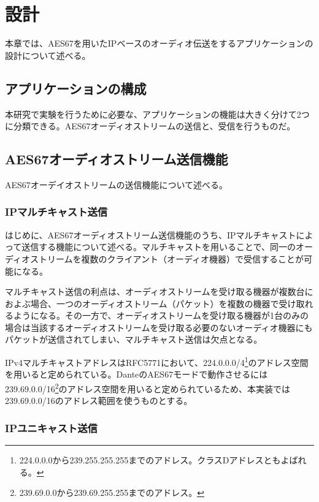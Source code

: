 \chapter{設計}
\label{chap:design}

本章では、AES67を用いたIPベースのオーディオ伝送をするアプリケーションの設計について述べる。

\section{アプリケーションの構成}

本研究で実験を行うために必要な、アプリケーションの機能は大きく分けて2つに分類できる。AES67オーディオストリームの送信と、受信を行うものだ。

\section{AES67オーディオストリーム送信機能}

AES67オーデイオストリームの送信機能について述べる。

\subsection{IPマルチキャスト送信}

はじめに、AES67オーディオストリーム送信機能のうち、IPマルチキャストによって送信する機能について述べる。マルチキャストを用いることで、同一のオーディオストリームを複数のクライアント（オーディオ機器）で受信することが可能になる。

マルチキャスト送信の利点は、オーディオストリームを受け取る機器が複数台におよぶ場合、一つのオーディオストリーム（パケット）を複数の機器で受け取れるようになる。その一方で、オーディオストリームを受け取る機器が1台のみの場合は当該するオーディオストリームを受け取る必要のないオーディオ機器にもパケットが送信されてしまい、マルチキャスト送信は欠点となる。

IPv4マルチキャストアドレスはRFC5771\cite{rfc5771}において、224.0.0.0/4\footnote{224.0.0.0から239.255.255.255までのアドレス。クラスDアドレスともよばれる。}のアドレス空間を用いると定められている。DanteのAES67モードで動作させるには239.69.0.0/16\footnote{239.69.0.0から239.69.255.255までのアドレス。}のアドレス空間を用いると定められているため、本実装では239.69.0.0/16のアドレス範囲を使うものとする。

\subsection{IPユニキャスト送信}


